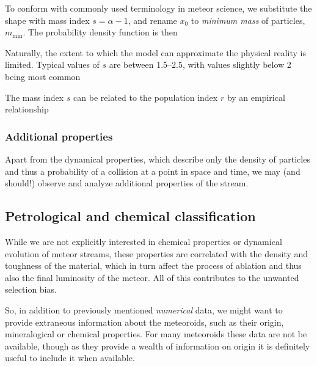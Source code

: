             To conform with commonly used terminology in meteor science, we substitute the shape with mass index
            $s = \alpha - 1$, and rename $x_0$ to \emph{minimum mass} of particles, $m_\mathrm{min}$.
            The probability density function is then

            Naturally, the extent to which the model can approximate the physical reality is limited.
            Typical values of $s$ are between \numrange{1.5}{2.5}, with values slightly below 2 being most common \cite{...}

            The mass index $s$ can be related to the population index $r$ by an empirical relationship

        \subsubsection{Additional properties} \label{mpa}
            Apart from the dynamical properties, which describe only the density of particles
            and thus a probability of a collision at a point in space and time,
            we may (and should!) observe and analyze additional properties of the stream.

            \subsection{Petrological and chemical classification} \label{mpac}
                While we are not explicitly interested in chemical properties
                or dynamical evolution of meteor streams, these properties
                are correlated with the density and toughness of the material,
                which in turn affect the process of ablation
                and thus also the final luminosity of the meteor.
                All of this contributes to the unwanted selection bias.

                So, in addition to previously mentioned \textit{numerical} data, we might want to
                provide extraneous information about the meteoroids, such as their origin,
                mineralogical or chemical properties.
                For many meteoroids these data are not be available,
                though as they provide a wealth of information on origin
                it is definitely useful to include it when available.


